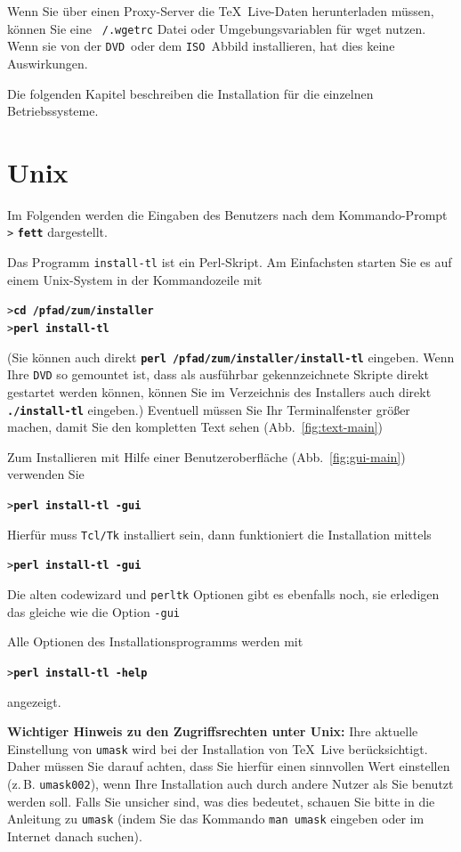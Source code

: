 \documentclass[12pt,ngerman,a4paper,fullparskip]{report}
\newcommand{\TL}{\TeX\ Live\xspace}
\newcommand{\acro}[1]{\texttt{#1}}
\newcommand{\code}[1]{\texttt{#1}}
\newcommand{\filename}[1]{\texttt{#1}}
\newcommand{\dirname}[1]{\texttt{#1}}
\newcommand{\samp}[1]{\texttt{#1}}
\newcommand{\Ucom}[1]{\textbf{\texttt{#1}}}
\providecommand*{\DVD}{\acro{DVD}\xspace}
\providecommand*{\ISO}{\acro{ISO}\xspace}
\begin{document}
Wenn Sie über einen Proxy-Server die \TL-Daten herunterladen müssen, können Sie eine \filename{~/.wgetrc} Datei oder Umgebungsvariablen für wget nutzen. Wenn sie von der \DVD\ oder dem \ISO\ Abbild installieren, hat dies keine Auswirkungen.


Die folgenden Kapitel beschreiben die Installation für die einzelnen Betriebssysteme.

\section{Unix}

Im Folgenden werden die Eingaben des Benutzers nach dem Kommando-Prompt \samp{>} \Ucom{fett} dargestellt.

Das Programm \filename{install-tl} ist ein Perl-Skript. Am Einfachsten starten
Sie es auf einem Unix-System in der Kommandozeile mit
\begin{alltt}
> \Ucom{cd /pfad/zum/installer}
> \Ucom{perl install-tl}
\end{alltt}

(Sie können auch direkt \Ucom{perl /pfad/zum/installer/install-tl} eingeben. Wenn Ihre \DVD so gemountet ist, dass als ausführbar gekennzeichnete Skripte direkt gestartet werden können, können Sie im Verzeichnis des Installers auch direkt \Ucom{./install-tl} eingeben.) Eventuell müssen Sie Ihr Terminalfenster größer machen, damit Sie den kompletten Text sehen (Abb.~\ref{fig:text-main})

Zum Installieren mit Hilfe einer Benutzeroberfläche (Abb.~\ref{fig:gui-main}) verwenden Sie

\begin{alltt}
> \Ucom{perl install-tl -gui}
\end{alltt}

Hierfür muss \dirname{Tcl/Tk} installiert sein, dann funktioniert die Installation mittels

\begin{alltt}
> \Ucom{perl install-tl -gui}
\end{alltt}

Die alten code{wizard} und \code{perltk} Optionen gibt es ebenfalls noch, sie erledigen das gleiche wie die Option \code{-gui}

Alle Optionen des Installationsprogramms werden mit
\begin{alltt}
> \Ucom{perl install-tl -help}
\end{alltt}
angezeigt.

\textbf{Wichtiger Hinweis zu den Zugriffsrechten unter Unix:} Ihre aktuelle Einstellung von \code{umask} wird bei der Installation von \TL berücksichtigt.  Daher müssen Sie darauf achten, dass Sie hierfür einen sinnvollen Wert einstellen (z.\,B. \code{umask002}), wenn Ihre Installation auch durch andere Nutzer als Sie benutzt werden soll. Falls Sie unsicher sind, was dies bedeutet, schauen Sie bitte in die Anleitung zu \code{umask} (indem Sie das Kommando \code{man umask} eingeben oder im Internet danach suchen).
\end{document}

